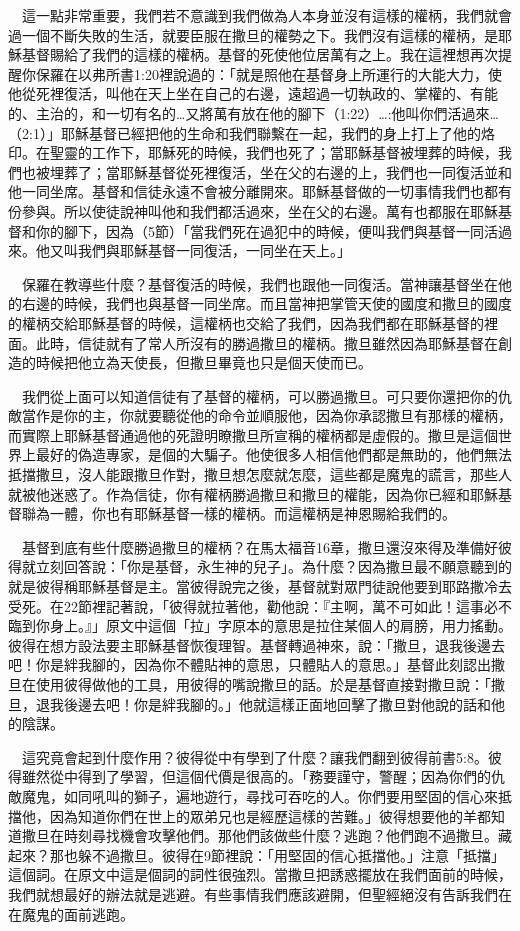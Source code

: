 \documentclass{book}
\begin{document}
　這一點非常重要，我們若不意識到我們做為人本身並沒有這樣的權柄，我們就會過一個不斷失敗的生活，就要臣服在撒旦的權勢之下。我們沒有這樣的權柄，是耶穌基督賜給了我們的這樣的權柄。基督的死使他位居萬有之上。我在這裡想再次提醒你保羅在以弗所書1:20裡說過的：「就是照他在基督身上所運行的大能大力，使他從死裡復活，叫他在天上坐在自己的右邊，遠超過一切執政的、掌權的、有能的、主治的，和一切有名的…又將萬有放在他的腳下（1:22）…:他叫你們活過來…（2:1）」耶穌基督已經把他的生命和我們聯繫在一起，我們的身上打上了他的烙印。在聖靈的工作下，耶穌死的時候，我們也死了；當耶穌基督被埋葬的時候，我們也被埋葬了；當耶穌基督從死裡復活，坐在父的右邊的上，我們也一同復活並和他一同坐席。基督和信徒永遠不會被分離開來。耶穌基督做的一切事情我們也都有份參與。所以使徒說神叫他和我們都活過來，坐在父的右邊。萬有也都服在耶穌基督和你的腳下，因為（5節）「當我們死在過犯中的時候，便叫我們與基督一同活過來。他又叫我們與耶穌基督一同復活，一同坐在天上。」

　保羅在教導些什麼？基督復活的時候，我們也跟他一同復活。當神讓基督坐在他的右邊的時候，我們也與基督一同坐席。而且當神把掌管天使的國度和撒旦的國度的權柄交給耶穌基督的時候，這權柄也交給了我們，因為我們都在耶穌基督的裡面。此時，信徒就有了常人所沒有的勝過撒旦的權柄。撒旦雖然因為耶穌基督在創造的時候把他立為天使長，但撒旦畢竟也只是個天使而已。

　我們從上面可以知道信徒有了基督的權柄，可以勝過撒旦。可只要你還把你的仇敵當作是你的主，你就要聽從他的命令並順服他，因為你承認撒旦有那樣的權柄，而實際上耶穌基督通過他的死證明瞭撒旦所宣稱的權柄都是虛假的。撒旦是這個世界上最好的偽造專家，是個的大騙子。他使很多人相信他們都是無助的，他們無法抵擋撒旦，沒人能跟撒旦作對，撒旦想怎麼就怎麼，這些都是魔鬼的謊言，那些人就被他迷惑了。作為信徒，你有權柄勝過撒旦和撒旦的權能，因為你已經和耶穌基督聯為一體，你也有耶穌基督一樣的權柄。而這權柄是神恩賜給我們的。

　基督到底有些什麼勝過撒旦的權柄？在馬太福音16章，撒旦還沒來得及準備好彼得就立刻回答說：「你是基督，永生神的兒子」。為什麼？因為撒旦最不願意聽到的就是彼得稱耶穌基督是主。當彼得說完之後，基督就對眾門徒說他要到耶路撒冷去受死。在22節裡記著說，「彼得就拉著他，勸他說：『主啊，萬不可如此！這事必不臨到你身上。』」原文中這個「拉」字原本的意思是拉住某個人的肩膀，用力搖動。彼得在想方設法要主耶穌基督恢復理智。基督轉過神來，說：「撒旦，退我後邊去吧！你是絆我腳的，因為你不體貼神的意思，只體貼人的意思。」基督此刻認出撒旦在使用彼得做他的工具，用彼得的嘴說撒旦的話。於是基督直接對撒旦說：「撒旦，退我後邊去吧！你是絆我腳的。」他就這樣正面地回擊了撒旦對他說的話和他的陰謀。

　這究竟會起到什麼作用？彼得從中有學到了什麼？讓我們翻到彼得前書5:8。彼得雖然從中得到了學習，但這個代價是很高的。「務要謹守，警醒；因為你們的仇敵魔鬼，如同吼叫的獅子，遍地遊行，尋找可吞吃的人。你們要用堅固的信心來抵擋他，因為知道你們在世上的眾弟兄也是經歷這樣的苦難。」彼得想要他的羊都知道撒旦在時刻尋找機會攻擊他們。那他們該做些什麼？逃跑？他們跑不過撒旦。藏起來？那也躲不過撒旦。彼得在9節裡說：「用堅固的信心抵擋他。」注意「抵擋」這個詞。在原文中這是個詞的詞性很強烈。當撒旦把誘惑擺放在我們面前的時候，我們就想最好的辦法就是逃避。有些事情我們應該避開，但聖經絕沒有告訴我們在在魔鬼的面前逃跑。
\end{document}
